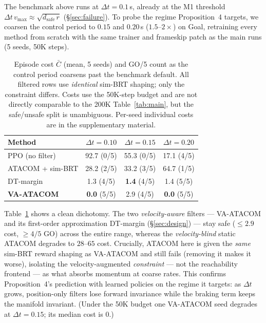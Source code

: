 \documentclass[letterpaper]{article}
\begin{document}
The benchmark above runs at $\Delta t{=}0.1$\,s, already at the M1 threshold $\Delta t\,v_{\max}\!\approx\!\sqrt{d_\text{safe}\,r}$ (\S\ref{sec:failure}). To probe the regime Proposition~4 targets, we coarsen the control period to $0.15$ and $0.20$\,s ($1.5$--$2\times$) on Goal, retraining every method from scratch with the same trainer and frameskip patch as the main runs (5 seeds, 50K steps).

\begin{table}[t]
\centering
\caption{Episode cost $\bar C$ (mean, 5 seeds) and GO/5 count as the control period coarsens past the benchmark default. All filtered rows use \emph{identical} sim-BRT shaping; only the constraint differs. Costs use the 50K-step budget and are not directly comparable to the 200K Table~\ref{tab:main}, but the safe/unsafe split is unambiguous. Per-seed individual costs are in the supplementary material.}
\label{tab:coarse}
\setlength{\tabcolsep}{4pt}
\begin{tabular}{lccc}
\toprule
Method & $\Delta t{=}0.10$ & $\Delta t{=}0.15$ & $\Delta t{=}0.20$ \\
\midrule
PPO (no filter)   & 92.7 (0/5) & 55.3 (0/5) & 17.1 (4/5) \\
ATACOM + sim-BRT  & 28.2 (2/5) & 33.2 (3/5) & 64.7 (1/5) \\
DT-margin         & 1.3 (4/5)  & \textbf{1.4} (4/5) & 1.4 (5/5) \\
\textbf{VA-ATACOM}& \textbf{0.0} (5/5) & 2.9 (4/5) & \textbf{0.0} (5/5) \\
\bottomrule
\end{tabular}
\end{table}

Table~\ref{tab:coarse} shows a clean dichotomy. The two \emph{velocity-aware} filters --- VA-ATACOM and its first-order approximation DT-margin (\S\ref{sec:design}) --- stay safe ($\le 2.9$ cost, $\ge 4/5$ GO) across the entire range, whereas the \emph{velocity-blind} static ATACOM degrades to $28$--$65$ cost. Crucially, ATACOM here is given the \emph{same} sim-BRT reward shaping as VA-ATACOM and still fails (removing it makes it worse), isolating the velocity-augmented \emph{constraint} --- not the reachability frontend --- as what absorbs momentum at coarse rates. This confirms Proposition~4's prediction with learned policies on the regime it targets: as $\Delta t$ grows, position-only filters lose forward invariance while the braking term keeps the manifold invariant. (Under the 50K budget one VA-ATACOM seed degrades at $\Delta t{=}0.15$; its median cost is $0$.)
\end{document}
